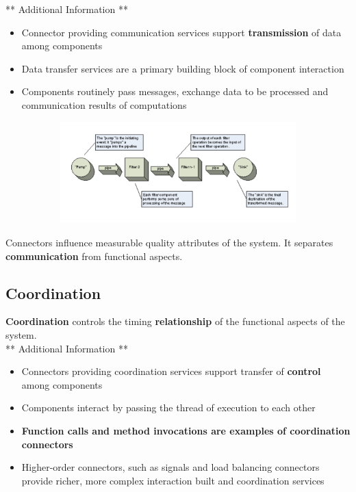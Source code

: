 \documentclass[a4paper]{article}
\begin{document}
** Additional Information **
\begin{itemize}
\item Connector providing communication services support \textbf{transmission} of data among components
\item Data transfer services are a primary building block of component interaction
\item Components routinely pass messages, exchange data to be processed and communication results of computations
\end{itemize}

\begin{figure}[H]
\centering
\hskip-2.5cm\begin{subfigure}{1\textwidth}
  \includegraphics[width=1\linewidth]
  {images/10-pipes.png}
\end{subfigure}
\end{figure}

Connectors influence measurable quality attributes of the system. It separates \textbf{communication} from functional aspects.
\subsection{Coordination}
\textbf{Coordination} controls the timing \textbf{relationship} of the functional aspects of the system. \\

** Additional Information ** 
\begin{itemize}
\item Connectors providing coordination services support transfer of \textbf{control} among components
\item Components interact by passing the thread of execution to each other
\item \textbf{Function calls and method invocations are examples of coordination connectors}
\item Higher-order connectors, such as signals and load balancing connectors provide richer, more complex interaction built and coordination services
\end{itemize}
\end{document}
